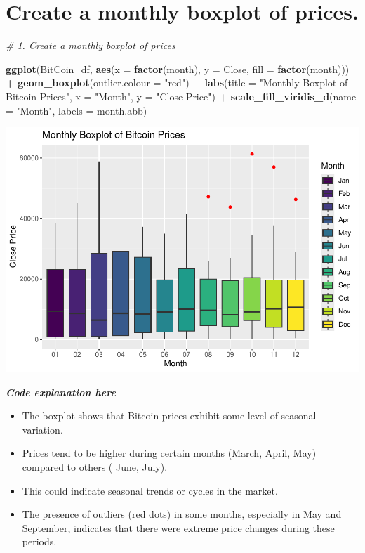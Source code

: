 \documentclass[
]{book}
\newenvironment{Shaded}{\begin{snugshade}}{\end{snugshade}}
\newcommand{\AttributeTok}[1]{\textcolor[rgb]{0.13,0.29,0.53}{#1}}
\newcommand{\CommentTok}[1]{\textcolor[rgb]{0.56,0.35,0.01}{\textit{#1}}}
\newcommand{\FunctionTok}[1]{\textcolor[rgb]{0.13,0.29,0.53}{\textbf{#1}}}
\newcommand{\NormalTok}[1]{#1}
\newcommand{\SpecialCharTok}[1]{\textcolor[rgb]{0.81,0.36,0.00}{\textbf{#1}}}
\newcommand{\StringTok}[1]{\textcolor[rgb]{0.31,0.60,0.02}{#1}}
\providecommand{\tightlist}{%
  \setlength{\itemsep}{0pt}\setlength{\parskip}{0pt}}
\begin{document}
\section*{Create a monthly boxplot of prices.}\label{create-a-monthly-boxplot-of-prices.}

\begin{Shaded}
\begin{Highlighting}[]
\CommentTok{\# 1. Create a monthly boxplot of prices}

\FunctionTok{ggplot}\NormalTok{(BitCoin\_df, }\FunctionTok{aes}\NormalTok{(}\AttributeTok{x =} \FunctionTok{factor}\NormalTok{(month), }\AttributeTok{y =}\NormalTok{ Close, }\AttributeTok{fill =} \FunctionTok{factor}\NormalTok{(month))) }\SpecialCharTok{+}
  \FunctionTok{geom\_boxplot}\NormalTok{(}\AttributeTok{outlier.colour =} \StringTok{"red"}\NormalTok{) }\SpecialCharTok{+}
  \FunctionTok{labs}\NormalTok{(}\AttributeTok{title =} \StringTok{"Monthly Boxplot of Bitcoin Prices"}\NormalTok{, }\AttributeTok{x =} \StringTok{"Month"}\NormalTok{, }\AttributeTok{y =} \StringTok{"Close Price"}\NormalTok{) }\SpecialCharTok{+}
  \FunctionTok{scale\_fill\_viridis\_d}\NormalTok{(}\AttributeTok{name =} \StringTok{"Month"}\NormalTok{, }\AttributeTok{labels =}\NormalTok{ month.abb)}
\end{Highlighting}
\end{Shaded}

\includegraphics{bookdown-demo_files/figure-latex/unnamed-chunk-9-1.pdf}

\emph{\textbf{Code explanation here}}

\begin{itemize}
\tightlist
\item
  The boxplot shows that Bitcoin prices exhibit some level of seasonal variation.
\item
  Prices tend to be higher during certain months (March, April, May) compared to others ( June, July).
\item
  This could indicate seasonal trends or cycles in the market.
\item
  The presence of outliers (red dots) in some months, especially in May and September, indicates that there were extreme price changes during these periods.
\end{itemize}
\end{document}

